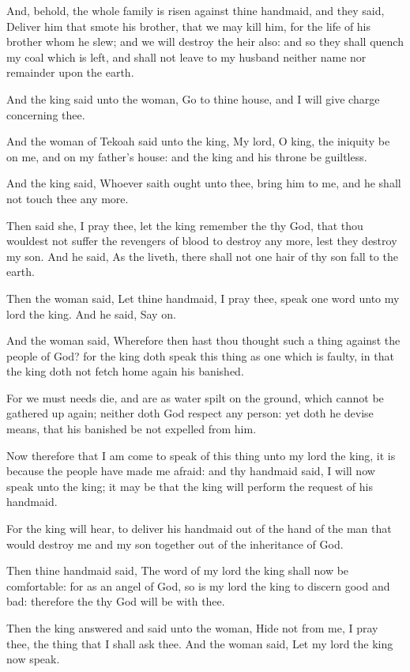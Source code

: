 \Verse And, behold, the whole family is risen against thine handmaid, and they said, Deliver him that smote his brother, that we may kill him, for the life of his brother whom he slew; and we will destroy the heir also: and so they shall quench my coal which is left, and shall not leave to my husband neither name nor remainder upon the earth.

\Verse And the king said unto the woman, Go to thine house, and I will give charge concerning thee.

\Verse And the woman of Tekoah said unto the king, My lord, O king, the iniquity be on me, and on my father's house: and the king and his throne be guiltless.

\Verse And the king said, Whoever saith ought unto thee, bring him to me, and he shall not touch thee any more.

\Verse Then said she, I pray thee, let the king remember the \LORD thy God, that thou wouldest not suffer the revengers of blood to destroy any more, lest they destroy my son. And he said, As the \LORD liveth, there shall not one hair of thy son fall to the earth.

\Verse Then the woman said, Let thine handmaid, I pray thee, speak one word unto my lord the king. And he said, Say on.

\Verse And the woman said, Wherefore then hast thou thought such a thing against the people of God? for the king doth speak this thing as one which is faulty, in that the king doth not fetch home again his banished.

\Verse For we must needs die, and are as water spilt on the ground, which cannot be gathered up again; neither doth God respect any person: yet doth he devise means, that his banished be not expelled from him.

\Verse Now therefore that I am come to speak of this thing unto my lord the king, it is because the people have made me afraid: and thy handmaid said, I will now speak unto the king; it may be that the king will perform the request of his handmaid.

\Verse For the king will hear, to deliver his handmaid out of the hand of the man that would destroy me and my son together out of the inheritance of God.

\Verse Then thine handmaid said, The word of my lord the king shall now be comfortable: for as an angel of God, so is my lord the king to discern good and bad: therefore the \LORD thy God will be with thee.

\Verse Then the king answered and said unto the woman, Hide not from me, I pray thee, the thing that I shall ask thee. And the woman said, Let my lord the king now speak.

